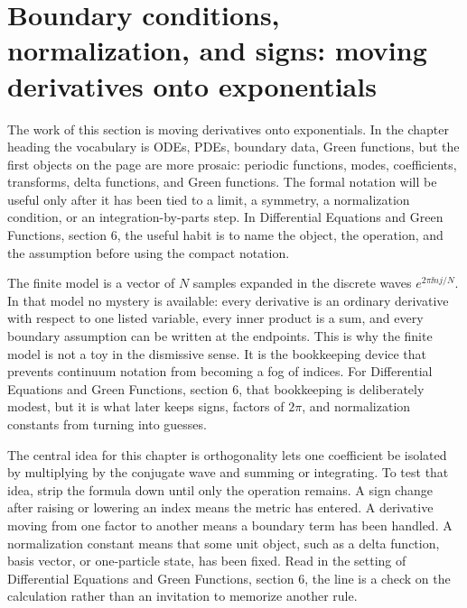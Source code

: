\section{Boundary conditions, normalization, and signs: moving derivatives onto exponentials}













The work of this section is moving derivatives onto exponentials.  In the chapter heading the vocabulary is ODEs, PDEs, boundary data, Green functions, but the first objects on the page are more prosaic: periodic functions, modes, coefficients, transforms, delta functions, and Green functions.  The formal notation will be useful only after it has been tied to a limit, a symmetry, a normalization condition, or an integration-by-parts step.  In Differential Equations and Green Functions, section 6, the useful habit is to name the object, the operation, and the assumption before using the compact notation.

The finite model is a vector of \(N\) samples expanded in the discrete waves \(e^{2\pi \ii nj/N}\).  In that model no mystery is available: every derivative is an ordinary derivative with respect to one listed variable, every inner product is a sum, and every boundary assumption can be written at the endpoints.  This is why the finite model is not a toy in the dismissive sense.  It is the bookkeeping device that prevents continuum notation from becoming a fog of indices.  For Differential Equations and Green Functions, section 6, that bookkeeping is deliberately modest, but it is what later keeps signs, factors of \(2\pi\), and normalization constants from turning into guesses.

The central idea for this chapter is orthogonality lets one coefficient be isolated by multiplying by the conjugate wave and summing or integrating.  To test that idea, strip the formula down until only the operation remains.  A sign change after raising or lowering an index means the metric has entered.  A derivative moving from one factor to another means a boundary term has been handled.  A normalization constant means that some unit object, such as a delta function, basis vector, or one-particle state, has been fixed.  Read in the setting of Differential Equations and Green Functions, section 6, the line is a check on the calculation rather than an invitation to memorize another rule.

